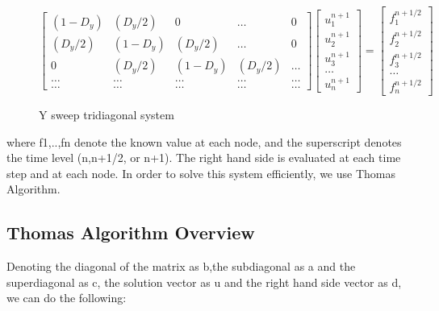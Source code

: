 \documentclass[12pt]{article}
\begin{document}
	\begin{figure}[H]

	\[	
	\begin{bmatrix}
		(1-D_y) & (D_y/2) & 0 & \dots & 0 \\
		(D_y/2) & (1-D_y) & (D_y/2) & \dots & 0 \\
		0 & (D_y/2) & (1-D_y) & (D_y/2) & \dots \\
		\dots  & \dots  & \dots  & \dots & \dots  \\
		\dots & \dots & \dots & \dots & \dots 
	\end{bmatrix}
	\begin{bmatrix}
		u_1^{n+1} \\ u_2^{n+1} \\ u_3^{n+1} \\ \dots \\ u_n^{n+1} 
	\end{bmatrix}
	=
	\begin{bmatrix}
		f^{n+1/2}_1 \\ f^{n+1/2}_2 \\ f^{n+1/2}_3 \\ \dots \\ f^{n+1/2}_n 
	\end{bmatrix}
	\]
	\caption{Y sweep tridiagonal system}
	\end{figure}
	\noindent	
	where f1,..,fn denote the known value at each node, and the superscript denotes the time level (n,n+1/2, or n+1). The right hand side is evaluated at each time step and at each node. In order to solve this system efficiently, we use Thomas Algorithm. 
	
	\subsection{Thomas Algorithm Overview}
	Denoting the diagonal of the matrix as b,the subdiagonal as a and the superdiagonal as c, the solution vector as u and the right hand side vector as d, we can do the following: 
	  
\end{document}
